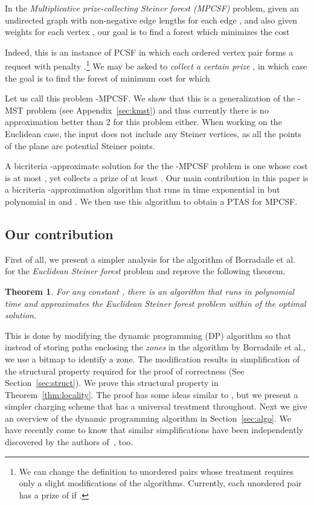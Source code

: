 \documentclass[extras,11pt]{article} \usepackage{fullpage}
\theoremstyle{mytheorem}
\newtheorem{theorem}{Theorem}
\newcommand{\prob}[1]{\textit{#1}}
\begin{document}
In the \prob{Multiplicative prize-collecting Steiner forest
(MPCSF)} problem, given an undirected graph  with
non-negative edge lengths  for each edge , and also
given weights  for each vertex , our goal is to
find a forest  which minimizes the cost

Indeed, this is an instance of PCSF in which each ordered vertex pair
 forms a request with penalty .\footnote{We can change the definition to unordered pairs whose treatment requires only a slight modifications of the algorithms.  Currently, each unordered pair  has a prize of  if .}
 We may be asked
to \emph{collect a certain prize }, in which case the goal is to
find the forest  of minimum cost for which

Let us call this problem -MPCSF. We show that this is a
generalization of the -MST problem (see Appendix~\ref{sec:kmst}) and thus currently there is no approximation better than 2
for this problem either. When working on the Euclidean case, the
input does not include any Steiner vertices, as all the points of
the plane are potential Steiner points.

A bicriteria -approximate solution for the the
-MPCSF problem is one whose cost is at most , yet
collects a prize of at least . Our main contribution in
this paper is a bicriteria -approximation
algorithm that runs in time exponential in  but polynomial
in  and . We then use this  algorithm to obtain a PTAS for
MPCSF.

\subsection{Our contribution}\label{sec:contrib}
First of all, we present a simpler \iffalse\footnote{TODO: how many pages to how many pages?  which lemmas correspond to what?}\fi analysis for the algorithm of
Borradaile et al.~\cite{BKM08:euc-for} for the
\prob{Euclidean Steiner forest} problem and reprove the following
theorem.
\begin{theorem}\label{thm:sf}
 For any constant , there is an algorithm that runs in polynomial time
 and approximates the \prob{Euclidean Steiner forest} problem within  of the
 optimal solution.
\end{theorem}
This is done by modifying the dynamic programming (DP) algorithm so
that instead of storing paths enclosing the \emph{zones} in the
algorithm by Borradaile et al., we use a bitmap to identify a zone.
The modification results in simplification of the structural
property required for the proof of correctness (See
Section~\ref{sec:struct}). We prove this structural property in
Theorem~\ref{thm:locality}. The proof has some ideas similar to
\cite{BKM08:euc-for}, but we present a simpler charging scheme that
has a universal treatment throughout. Next we give an overview of 
the dynamic programming algorithm in Section~\ref{sec:algo}. We have recently come to know that similar simplifications have been independently discovered by
the authors of~\cite{BKM08:euc-for}, too.
\end{document}

